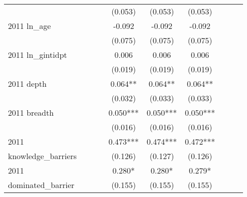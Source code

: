 \begin{table}[htbp]
\begin{tabular}{l*{9}{c}}
                    &               &               &               &     (0.053)   &     (0.053)   &     (0.053)   &               &               &               \\
2011 ln\_age         &               &               &               &      -0.092   &      -0.092   &      -0.092   &               &               &               \\
                    &               &               &               &     (0.075)   &     (0.075)   &     (0.075)   &               &               &               \\
2011 ln\_gintidpt    &               &               &               &       0.006   &       0.006   &       0.006   &               &               &               \\
                    &               &               &               &     (0.019)   &     (0.019)   &     (0.019)   &               &               &               \\
2011 depth          &               &               &               &       0.064** &       0.064** &       0.064** &               &               &               \\
                    &               &               &               &     (0.032)   &     (0.033)   &     (0.033)   &               &               &               \\
2011 breadth        &               &               &               &       0.050***&       0.050***&       0.050***&               &               &               \\
                    &               &               &               &     (0.016)   &     (0.016)   &     (0.016)   &               &               &               \\
2011                &               &               &               &       0.473***&       0.474***&       0.472***&               &               &               \\
knowledge\_barriers  &               &               &               &     (0.126)   &     (0.127)   &     (0.126)   &               &               &               \\
2011                &               &               &               &       0.280*  &       0.280*  &       0.279*  &               &               &               \\
dominated\_barrier   &               &               &               &     (0.155)   &     (0.155)   &     (0.155)   &               &               &               \\

\end{tabular}
\end{table}

